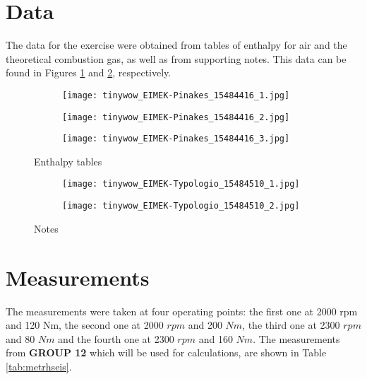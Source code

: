 \documentclass{report}
\begin{document}
\newpage
\section{%
Data}
The data for the exercise were obtained from tables of enthalpy for air and the theoretical combustion gas, as well as from supporting notes. This data can be found in Figures \ref{fig:enthalpies} and \ref{fig:ypost}, respectively.

\begin{figure}[h]
    \centering
    \begin{subfigure}[b]{0.3\textwidth}
        \centering
        \texttt{[image: tinywow\_EIMEK-Pinakes\_15484416\_1.jpg]}
    \end{subfigure}
    \hfill
    \begin{subfigure}[b]{.3\textwidth}
        \centering
        \texttt{[image: tinywow\_EIMEK-Pinakes\_15484416\_2.jpg]}
    \end{subfigure}
    \hfill
    \begin{subfigure}[b]{.3\textwidth}
        \centering
        \texttt{[image: tinywow\_EIMEK-Pinakes\_15484416\_3.jpg]}
    \end{subfigure}
    \caption{%
    Enthalpy tables}
    \label{fig:enthalpies}
\end{figure}

\begin{figure}[h]
    \centering
    \begin{subfigure}[b]{0.4\textwidth}
        \centering
        \texttt{[image: tinywow\_EIMEK-Typologio\_15484510\_1.jpg]}
    \end{subfigure}
    \hfill
    \begin{subfigure}[b]{.4\textwidth}
        \centering
        \texttt{[image: tinywow\_EIMEK-Typologio\_15484510\_2.jpg]}
    \end{subfigure}
    \caption{%
    Notes}
    \label{fig:ypost}
\end{figure}

\newpage
\section{%
Measurements}
The measurements were taken at four operating points: the first one at 2000 rpm and 120 Nm, the second one at 2000 $rpm$ and 200 $Nm$, the third one at 2300 $rpm$ and 80 $Nm$ and the fourth one at 2300 $rpm$ and 160 $Nm$. The measurements from \textbf{GROUP 12} which will be used for calculations, are shown in Table \ref{tab:metrhseis}.
\end{document}
